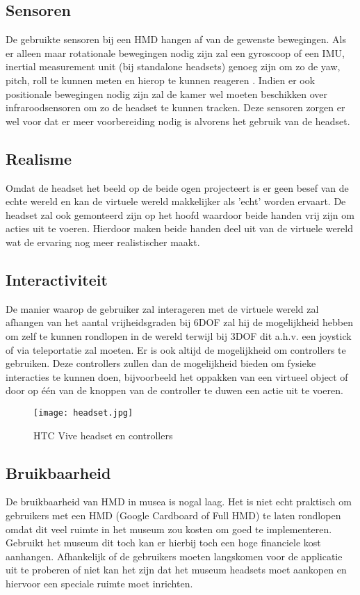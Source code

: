 \subsection{Sensoren}
De gebruikte sensoren bij een HMD hangen af van de gewenste bewegingen. Als er alleen maar rotationale bewegingen nodig zijn zal een gyroscoop of een IMU, inertial measurement unit (bij standalone headsets) genoeg zijn om zo de yaw, pitch, roll te kunnen meten en hierop te kunnen reageren \autocite{LaValle2014}. Indien er ook positionale bewegingen nodig zijn zal de kamer wel moeten beschikken over infraroodsensoren om zo de headset te kunnen tracken. Deze sensoren zorgen er wel voor dat er meer voorbereiding nodig is alvorens het gebruik van de headset.
\subsection{Realisme}
Omdat de headset het beeld op de beide ogen projecteert is er geen besef van de echte wereld en kan de virtuele wereld makkelijker als 'echt' worden ervaart. De headset zal ook gemonteerd zijn op het hoofd waardoor beide handen vrij zijn om acties uit te voeren. Hierdoor maken beide handen deel uit van de virtuele wereld wat de ervaring nog meer realistischer maakt.
\subsection{Interactiviteit}
De manier waarop de gebruiker zal interageren met de virtuele wereld zal afhangen van het aantal vrijheidsgraden bij 6DOF zal hij de mogelijkheid hebben om zelf te kunnen rondlopen in de wereld terwijl bij 3DOF dit a.h.v. een joystick of via teleportatie zal moeten. Er is ook altijd de mogelijkheid om controllers te gebruiken. Deze controllers zullen dan de mogelijkheid bieden om fysieke interacties te kunnen doen, bijvoorbeeld het oppakken van een virtueel object of door op één van de knoppen van de controller te duwen een actie uit te voeren.

\begin{figure}
    \texttt{[image: headset.jpg]}
    \caption{HTC Vive headset en controllers}
    \label{fig:htcvive}
\end{figure}

\subsection{Bruikbaarheid}
De bruikbaarheid van HMD in musea is nogal laag. Het is niet echt praktisch om gebruikers met een HMD (Google Cardboard of Full HMD) te laten rondlopen omdat dit veel ruimte in het museum zou kosten om goed te implementeren. Gebruikt het museum dit toch kan er hierbij toch een hoge financiele kost aanhangen. Afhankelijk of de gebruikers moeten langskomen voor de applicatie uit te proberen of niet kan het zijn dat het museum headsets moet aankopen en hiervoor een speciale ruimte moet inrichten.


